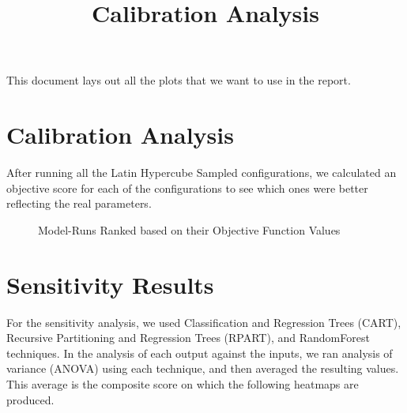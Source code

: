 \documentclass{article}
\begin{document}


  \title{Calibration Analysis}
	\maketitle
	
	This document lays out all the plots that we want to use in the report.
	
	

\section{Calibration Analysis}
After running all the Latin Hypercube Sampled configurations, we calculated an objective score for each of the configurations to see which ones were better reflecting the real parameters.
  
  \begin{figure}[ht]
		\caption{Model-Runs Ranked based on their Objective Function Values}
	\end{figure}
	
\section{Sensitivity Results}
For the sensitivity analysis, we used Classification and Regression Trees (CART), Recursive Partitioning and Regression Trees (RPART), and RandomForest techniques. In the analysis of each output against the inputs, we ran analysis of variance (ANOVA) using each technique, and then averaged the resulting values. This average is the composite score on which the following heatmaps are produced.
\end{document}
